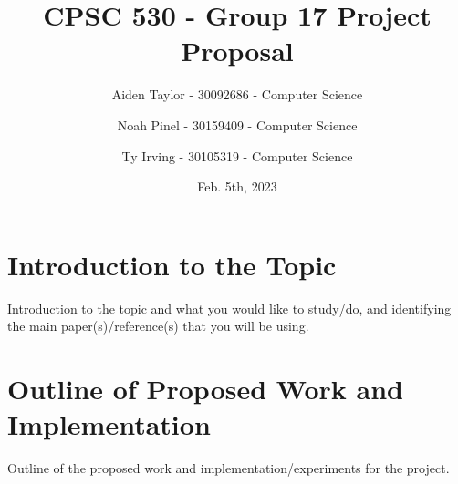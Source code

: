 \documentclass[11pt]{article}
\title{CPSC 530 - Group 17 Project Proposal}
\author{
Aiden Taylor - 30092686 - Computer Science
\and
Noah Pinel - 30159409 - Computer Science
\and
Ty Irving - 30105319 - Computer Science
}
\date{Feb. 5th, 2023}
\begin{document}
\maketitle
\newpage

\section*{Introduction to the Topic}
Introduction to the topic and what you would like to study/do, and identifying the main paper(s)/reference(s) that you will be using.

\section*{Outline of Proposed Work and Implementation}
Outline of the proposed work and implementation/experiments for the project.
\end{document}
